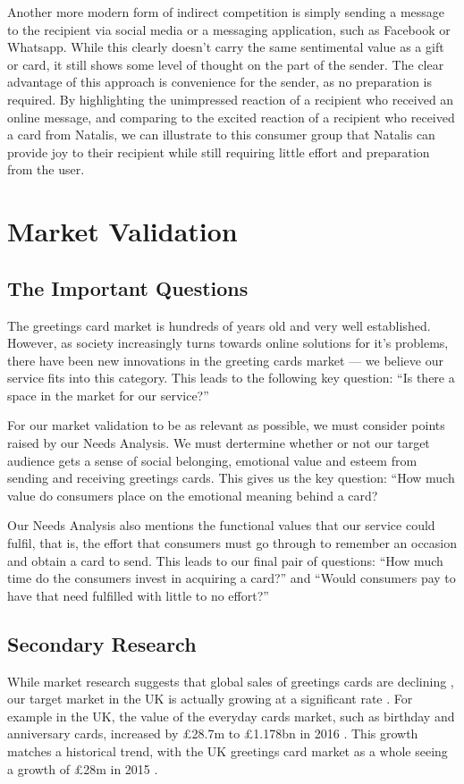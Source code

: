 \documentclass[10pt,a4paper]{article}
\begin{document}
Another more modern form of indirect competition is simply sending a message to the recipient via social media or a messaging application, such as Facebook or Whatsapp. While this clearly doesn't carry the same sentimental value as a gift or card, it still shows some level of thought on the part of the sender. The clear advantage of this approach is convenience for the sender, as no preparation is required. By highlighting the unimpressed reaction of a recipient who received an online message, and comparing to the excited reaction of a recipient who received a card from Natalis, we can illustrate to this consumer group that Natalis can provide joy to their recipient while still requiring little effort and preparation from the user.

\section*{Market Validation}

\subsection*{The Important Questions}
The greetings card market is hundreds of years old and very well established. However, as society increasingly turns towards online solutions for it's problems, there have been new innovations in the greeting cards market --- we believe our service fits into this category. This leads to the following key question: ``Is there a space in the market for our service?''

For our market validation to be as relevant as possible, we must consider points raised by our Needs Analysis. We must dertermine whether or not our target audience gets a sense of social belonging, emotional value and esteem from sending and receiving greetings cards. This gives us the key question: ``How much value do consumers place on the emotional meaning behind a card?

Our Needs Analysis also mentions the functional values that our service could fulfil, that is, the effort that consumers must go through to remember an occasion and obtain a card to send. This leads to our final pair of questions: ``How much time do the consumers invest in acquiring a card?'' and ``Would consumers pay to have that need fulfilled with little to no effort?''

\subsection*{Secondary Research}
While market research suggests that global sales of greetings cards are declining \citep{strategyr}, our target market in the UK is actually growing at a significant rate \citep{greetingcardassociation}. For example in the UK, the value of the everyday cards market, such as birthday and anniversary cards, increased by \pounds28.7m to \pounds1.178bn in 2016 \citep{greetingcardassociation}. This growth matches a historical trend, with the UK greetings card market as a whole seeing a growth of \pounds28m in 2015 \citep{mintel}.
\end{document}
